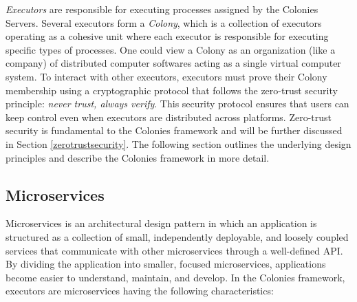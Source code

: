 \documentclass{article}
\begin{document}
\emph{Executors} are responsible for executing processes assigned by the Colonies Servers. Several executors form a \emph{Colony}, which is a collection of executors operating as a cohesive unit where each executor is responsible for executing specific types of processes. One could view a Colony as an organization (like a company) of distributed computer softwares acting as a single virtual computer system. To interact with other executors, executors must prove their Colony membership using a cryptographic protocol that follows the zero-trust security principle: \emph{never trust, always verify}. This security protocol ensures that users can keep control even when executors are distributed across platforms. Zero-trust security is fundamental to the Colonies framework and will be further discussed in Section \ref{zerotrustsecurity}. The following section outlines the underlying design principles and describe the Colonies framework in more detail. 

\subsection{Microservices}
Microservices \cite{microservices} is an architectural design pattern in which an application is structured as a collection of small, independently deployable, and loosely coupled services that communicate with other microservices through a well-defined API. By dividing the application into smaller, focused microservices, applications become easier to understand, maintain, and develop. In the Colonies framework, executors are microservices having the following characteristics:
\end{document}
